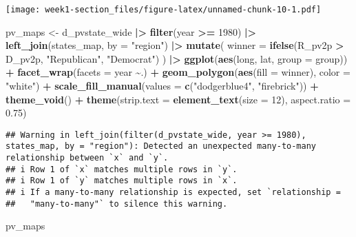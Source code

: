 \documentclass[
]{article}
\newenvironment{Shaded}{\begin{snugshade}}{\end{snugshade}}
\newcommand{\AttributeTok}[1]{\textcolor[rgb]{0.13,0.29,0.53}{#1}}
\newcommand{\DecValTok}[1]{\textcolor[rgb]{0.00,0.00,0.81}{#1}}
\newcommand{\FloatTok}[1]{\textcolor[rgb]{0.00,0.00,0.81}{#1}}
\newcommand{\FunctionTok}[1]{\textcolor[rgb]{0.13,0.29,0.53}{\textbf{#1}}}
\newcommand{\NormalTok}[1]{#1}
\newcommand{\OtherTok}[1]{\textcolor[rgb]{0.56,0.35,0.01}{#1}}
\newcommand{\SpecialCharTok}[1]{\textcolor[rgb]{0.81,0.36,0.00}{\textbf{#1}}}
\newcommand{\StringTok}[1]{\textcolor[rgb]{0.31,0.60,0.02}{#1}}
\begin{document}
\texttt{[image: week1-section\_files/figure-latex/unnamed-chunk-10-1.pdf]}

\begin{Shaded}
\begin{Highlighting}[]
\NormalTok{pv\_maps }\OtherTok{\textless{}{-}}\NormalTok{ d\_pvstate\_wide }\SpecialCharTok{|\textgreater{}}
  \FunctionTok{filter}\NormalTok{(year }\SpecialCharTok{\textgreater{}=} \DecValTok{1980}\NormalTok{) }\SpecialCharTok{|\textgreater{}}
  \FunctionTok{left\_join}\NormalTok{(states\_map, }\AttributeTok{by =} \StringTok{"region"}\NormalTok{) }\SpecialCharTok{|\textgreater{}}
  \FunctionTok{mutate}\NormalTok{(}
    \AttributeTok{winner =} \FunctionTok{ifelse}\NormalTok{(R\_pv2p }\SpecialCharTok{\textgreater{}}\NormalTok{ D\_pv2p, }\StringTok{"Republican"}\NormalTok{, }\StringTok{"Democrat"}\NormalTok{)}
\NormalTok{  ) }\SpecialCharTok{|\textgreater{}}
  \FunctionTok{ggplot}\NormalTok{(}\FunctionTok{aes}\NormalTok{(long, lat, }\AttributeTok{group =}\NormalTok{ group)) }\SpecialCharTok{+}
  \FunctionTok{facet\_wrap}\NormalTok{(}\AttributeTok{facets =}\NormalTok{ year }\SpecialCharTok{\textasciitilde{}}\NormalTok{.) }\SpecialCharTok{+}
  \FunctionTok{geom\_polygon}\NormalTok{(}\FunctionTok{aes}\NormalTok{(}\AttributeTok{fill =}\NormalTok{ winner), }\AttributeTok{color =} \StringTok{"white"}\NormalTok{) }\SpecialCharTok{+}
  \FunctionTok{scale\_fill\_manual}\NormalTok{(}\AttributeTok{values =} \FunctionTok{c}\NormalTok{(}\StringTok{"dodgerblue4"}\NormalTok{, }\StringTok{"firebrick"}\NormalTok{)) }\SpecialCharTok{+}
  \FunctionTok{theme\_void}\NormalTok{() }\SpecialCharTok{+}
  \FunctionTok{theme}\NormalTok{(}\AttributeTok{strip.text =} \FunctionTok{element\_text}\NormalTok{(}\AttributeTok{size =} \DecValTok{12}\NormalTok{), }
        \AttributeTok{aspect.ratio =} \FloatTok{0.75}\NormalTok{)}
\end{Highlighting}
\end{Shaded}

\begin{verbatim}
## Warning in left_join(filter(d_pvstate_wide, year >= 1980), states_map, by = "region"): Detected an unexpected many-to-many relationship between `x` and `y`.
## i Row 1 of `x` matches multiple rows in `y`.
## i Row 1 of `y` matches multiple rows in `x`.
## i If a many-to-many relationship is expected, set `relationship =
##   "many-to-many"` to silence this warning.
\end{verbatim}

\begin{Shaded}
\begin{Highlighting}[]
\NormalTok{pv\_maps}
\end{Highlighting}
\end{Shaded}
\end{document}
